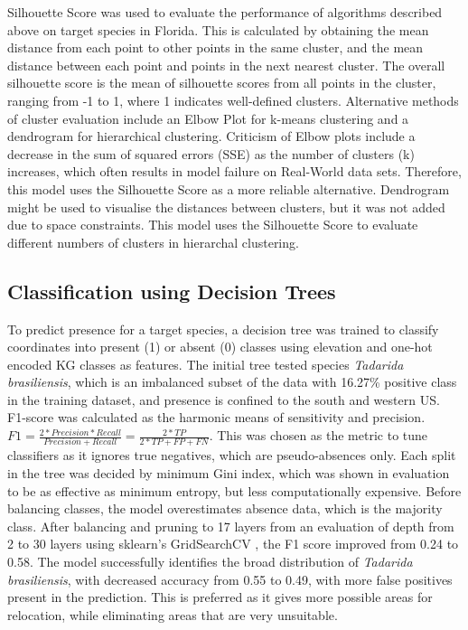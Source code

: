 \documentclass{article}
\begin{document}
Silhouette Score was used to evaluate the performance of algorithms described above on target species in Florida. This is calculated by obtaining the mean distance from each point to other points in the same cluster, and the mean distance between each point and points in the next nearest cluster. The overall silhouette score is the mean of silhouette scores from all points in the cluster, ranging from -1 to 1, where 1 indicates well-defined clusters. Alternative methods of cluster evaluation include an Elbow Plot for k-means clustering and a dendrogram for hierarchical clustering. Criticism of Elbow plots \cite{milligan1985clusters, ketchen1996cluster, schubert2023elbow} include a decrease in the sum of squared errors (SSE) as the number of clusters (k) increases, which often results in model failure on Real-World data sets. Therefore, this model uses the Silhouette Score as a more reliable alternative. Dendrogram might be used to visualise the distances between clusters, but it was not added due to space constraints. This model uses the Silhouette Score to evaluate different numbers of clusters in hierarchal clustering. 
 
\subsection{Classification using Decision Trees}
To predict presence for a target species, a decision tree was trained to classify coordinates into present (1) or absent (0) classes using elevation and one-hot encoded KG classes as features. The initial tree tested species \textit{Tadarida brasiliensis}, which is an imbalanced subset of the data with 16.27\% positive class in the training dataset, and presence is confined to the south and western US. F1-score was calculated as the harmonic means of sensitivity and precision. $F1 = \frac{2*Precision*Recall}{Precision+Recall} = \frac{2*TP}{2*TP+FP+FN}$. This was chosen as the metric to tune classifiers as it ignores true negatives, which are pseudo-absences only. Each split in the tree was decided by minimum Gini index, which was shown in evaluation to be as effective as minimum entropy, but less computationally expensive. Before balancing classes, the model overestimates absence data, which is the majority class. After balancing and pruning to 17 layers from an evaluation of depth from 2 to 30 layers using sklearn's GridSearchCV \cite{scikit-learn}, the F1 score improved from 0.24 to 0.58. The model successfully identifies the broad distribution of \textit{Tadarida brasiliensis}, with decreased accuracy from 0.55 to 0.49, with more false positives present in the prediction. This is preferred as it gives more possible areas for relocation, while eliminating areas that are very unsuitable.
\end{document}
